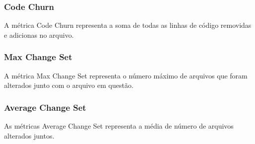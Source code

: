 \subsubsection{Code Churn}
A métrica Code Churn representa a soma de todas as linhas de código removidas e adicionas no arquivo.
\subsubsection{Max Change Set}
A métrica Max Change Set representa o número máximo de arquivos que foram alterados junto com o arquivo em questão.
\subsubsection{Average Change Set}
As métricas Average Change Set representa a média de número de arquivos alterados juntos.


